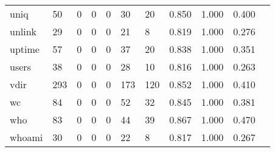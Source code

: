 \begin{longtable}{lp{1.10cm}p{1.10cm}p{1.10cm}p{1.10cm}p{1.10cm}p{1.10cm}p{1.10cm}p{1.10cm}p{1.10cm}p{1.10cm}}
uniq      &                     50 &                                  0 &                                 0 &                                0 &                                30 &                              20 &                          0.850 &                                 1.000 &                               0.400 \\
unlink    &                     29 &                                  0 &                                 0 &                                0 &                                21 &                               8 &                          0.819 &                                 1.000 &                               0.276 \\
uptime    &                     57 &                                  0 &                                 0 &                                0 &                                37 &                              20 &                          0.838 &                                 1.000 &                               0.351 \\
users     &                     38 &                                  0 &                                 0 &                                0 &                                28 &                              10 &                          0.816 &                                 1.000 &                               0.263 \\
vdir      &                    293 &                                  0 &                                 0 &                                0 &                               173 &                             120 &                          0.852 &                                 1.000 &                               0.410 \\
wc        &                     84 &                                  0 &                                 0 &                                0 &                                52 &                              32 &                          0.845 &                                 1.000 &                               0.381 \\
who       &                     83 &                                  0 &                                 0 &                                0 &                                44 &                              39 &                          0.867 &                                 1.000 &                               0.470 \\
whoami    &                     30 &                                  0 &                                 0 &                                0 &                                22 &                               8 &                          0.817 &                                 1.000 &                               0.267 \\

\end{longtable}
